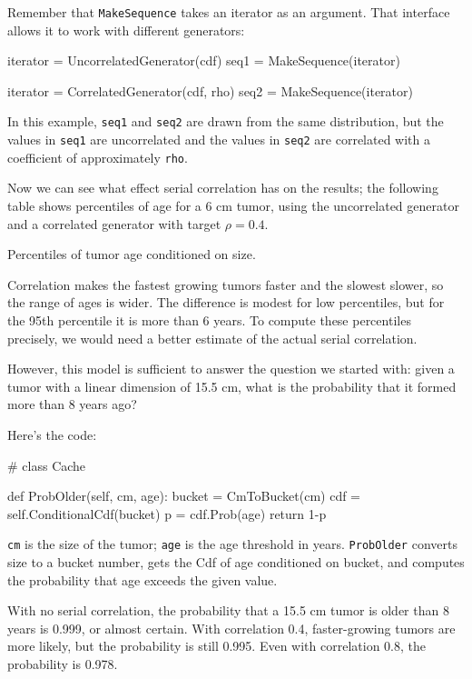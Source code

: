 \documentclass[12pt]{book}
\theoremstyle{exercise}
\begin{document}
Remember that {\tt MakeSequence} takes an iterator as an argument.
That interface allows it to work with different generators:

\begin{code}
    iterator = UncorrelatedGenerator(cdf)
    seq1 = MakeSequence(iterator)

    iterator = CorrelatedGenerator(cdf, rho)
    seq2 = MakeSequence(iterator)
\end{code}

In this example, {\tt seq1} and {\tt seq2} are
drawn from the same distribution, but the values in {\tt seq1}
are uncorrelated and the values in {\tt seq2} are correlated
with a coefficient of approximately {\tt rho}.

Now we can see what effect serial correlation has on the results;
the following table shows percentiles of age for a 6 cm tumor,
using the uncorrelated generator and a correlated generator
with target $\rho = 0.4$.

\begin{table}

\caption{Percentiles of tumor age conditioned on size.}
\end{table}

Correlation makes the fastest growing tumors faster and the slowest
slower, so the range of ages is wider.  The difference is modest for
low percentiles, but for the 95th percentile it is more than 6 years.
To compute these percentiles precisely, we would need a better
estimate of the actual serial correlation.

However, this model is sufficient to answer the question
we started with: given a tumor with a linear dimension of
15.5 cm, what is the probability that it formed more than
8 years ago?

Here's the code:

\begin{code}
# class Cache

    def ProbOlder(self, cm, age):
        bucket = CmToBucket(cm)
        cdf = self.ConditionalCdf(bucket)
        p = cdf.Prob(age)
        return 1-p
\end{code}

{\tt cm} is the size of the tumor; {\tt age} is the age threshold
in years.  {\tt ProbOlder} converts size to a bucket number,
gets the Cdf of age conditioned on bucket, and computes the
probability that age exceeds the given value.

With no serial correlation, the probability that a
15.5 cm tumor is older than 8 years is 0.999, or almost certain.
With correlation 0.4, faster-growing tumors are more likely, but
the probability is still 0.995.  Even with correlation 0.8, the
probability is 0.978.
\end{document}
